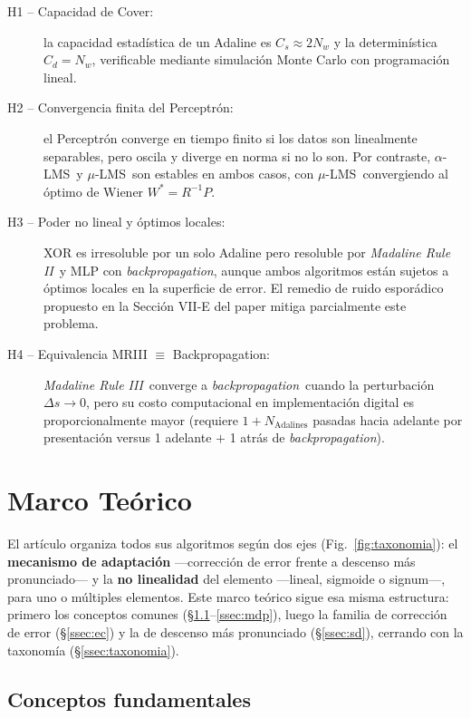 \documentclass[11pt,a4paper]{article}
\newcommand{\aLMS}{$\alpha$-LMS}
\newcommand{\muLMS}{$\mu$-LMS}
\newcommand{\bp}{\textit{backpropagation}}
\newcommand{\mrii}{\textit{Madaline Rule II}}
\newcommand{\mriii}{\textit{Madaline Rule III}}
\begin{document}
\begin{description}
    \item[H1 -- Capacidad de Cover:] la capacidad estadística de un Adaline es $C_s \approx 2N_w$
    y la determinística $C_d = N_w$, verificable mediante simulación Monte Carlo con programación
    lineal.
    \item[H2 -- Convergencia finita del Perceptrón:] el Perceptrón converge en tiempo finito si
    los datos son linealmente separables, pero oscila y diverge en norma si no lo son. Por
    contraste, \aLMS~y \muLMS~son estables en ambos casos, con \muLMS~convergiendo al óptimo de
    Wiener $W^* = R^{-1}P$.
    \item[H3 -- Poder no lineal y óptimos locales:] XOR es irresoluble por un solo Adaline pero
    resoluble por \mrii~y MLP con \bp, aunque ambos algoritmos están sujetos a óptimos locales
    en la superficie de error. El remedio de ruido esporádico propuesto en la Sección VII-E del
    paper \cite{widrow1990} mitiga parcialmente este problema.
    \item[H4 -- Equivalencia MRIII $\equiv$ Backpropagation:] \mriii~converge a \bp~cuando la
    perturbación $\Delta s \to 0$, pero su costo computacional en implementación digital es
    proporcionalmente mayor (requiere $1 + N_{\text{Adalines}}$ pasadas hacia adelante por
    presentación versus 1 adelante $+$ 1 atrás de \bp).
\end{description}

\section{Marco Teórico}

El artículo organiza todos sus algoritmos según dos ejes (Fig.~\ref{fig:taxonomia}): el
\textbf{mecanismo de adaptación} —corrección de error frente a descenso más pronunciado— y la
\textbf{no linealidad} del elemento —lineal, sigmoide o signum—, para uno o múltiples elementos.
Este marco teórico sigue esa misma estructura: primero los conceptos comunes
(§\ref{ssec:fundamentos}--\ref{ssec:mdp}), luego la familia de corrección de error
(§\ref{ssec:ec}) y la de descenso más pronunciado (§\ref{ssec:sd}), cerrando con la taxonomía
(§\ref{ssec:taxonomia}).

\subsection{Conceptos fundamentales}\label{ssec:fundamentos}
\end{document}
